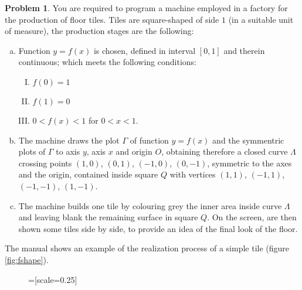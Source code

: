 \documentclass[a4paper,12pt,reqno]{amsart}
\theoremstyle{definition}
\newtheorem{problem}{Problem}
\begin{document}
\begin{problem}
You are required to program a machine employed in a factory for the production of floor tiles.
Tiles are square-shaped of side $1$ (in a suitable unit of measure), the production stages are the following:
\begin{enumerate}[(a)]
\item Function $y=f(x)$ is chosen, defined in interval $[0,1]$ and therein continuous; which meets the following
conditions:
\begin{enumerate}[I.]
\item \label{itm:1} $f(0) = 1$
\item \label{itm:2} $f(1) = 0$
\item \label{itm:3} $0 < f(x) < 1$ for $0 < x < 1$.
\end{enumerate}
\item The machine draws the plot $\Gamma$ of function $y=f(x)$ and the symmentric plots of $\Gamma$
to axis $y$, axis $x$ and origin $O$, obtaining therefore a closed curve $\Lambda$ crossing points
$(1,0)$, $(0,1)$, $(-1,0)$, $(0,-1)$, symmetric to the axes and the origin, contained inside square $Q$
with vertices $(1,1)$, $(-1,1)$, $(-1,-1)$, $(1,-1)$.
\item The machine builds one tile by colouring grey the inner area inside curve $\Lambda$ and leaving blank
the remaining surface in square $Q$. On the screen, are then shown some tiles side by side, to provide an idea
of the final look of the floor.
\end{enumerate}
The manual shows an example of the realization process of a simple tile (figure \ref{fig:fshape}).
%
   \begin{figure}
   \centering
{}=[scale=0.25]
\quad
{}
\end{figure}
\end{problem}
\end{document}
